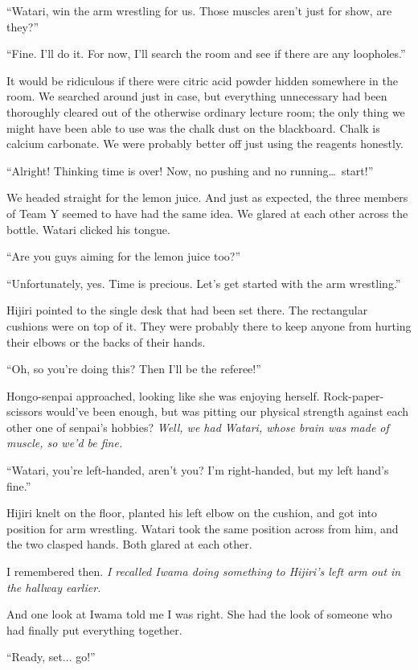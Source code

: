 \documentclass[
    a4paper,
    12pt,
    twoside,
    openany,
    UTF8,
    fontset=windows
]{ctexbook}
\begin{document}
``Watari, win the arm wrestling for us. Those muscles aren't just for show, are they?''

``Fine. I'll do it. For now, I'll search the room and see if there are any loopholes.''

It would be ridiculous if there were citric acid powder hidden somewhere in the room. We searched around just in case, but everything unnecessary had been thoroughly cleared out of the otherwise ordinary lecture room; the only thing we might have been able to use was the chalk dust on the blackboard. Chalk is calcium carbonate. We were probably better off just using the reagents honestly.

``Alright! Thinking time is over! Now, no pushing and no running\dots\ start!''

We headed straight for the lemon juice. And just as expected, the three members of Team Y seemed to have had the same idea. We glared at each other across the bottle. Watari clicked his tongue.

``Are you guys aiming for the lemon juice too?''

``Unfortunately, yes. Time is precious. Let's get started with the arm wrestling.''

Hijiri pointed to the single desk that had been set there. The rectangular cushions were on top of it. They were probably there to keep anyone from hurting their elbows or the backs of their hands.

``Oh, so you're doing this? Then I'll be the referee!''

Hongo-senpai approached, looking like she was enjoying herself. Rock-paper-scissors would've been enough, but was pitting our physical strength against each other one of senpai's hobbies? \textit{Well, we had Watari, whose brain was made of muscle, so we'd be fine.}

``Watari, you're left-handed, aren't you? I'm right-handed, but my left hand's fine.''

Hijiri knelt on the floor, planted his left elbow on the cushion, and got into position for arm wrestling. Watari took the same position across from him, and the two clasped hands. Both glared at each other.

I remembered then. \textit{I recalled Iwama doing something to Hijiri's left arm out in the hallway earlier.}

And one look at Iwama told me I was right. She had the look of someone who had finally put everything together.

``Ready, set... go!''
\end{document}
